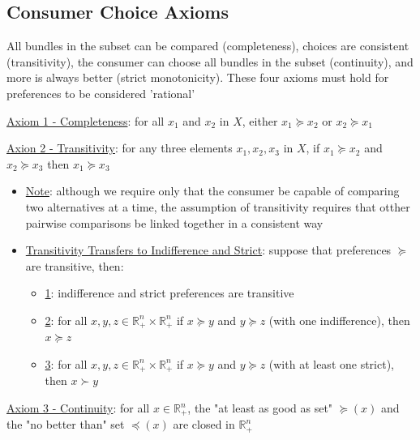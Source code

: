 \documentclass{article}
\begin{document}
\subsection{Consumer Choice Axioms}
All bundles in the subset can be compared (completeness), choices are consistent (transitivity), the consumer can choose all bundles in the subset (continuity), and more is always better (strict monotonicity). These four axioms must hold for preferences to be considered 'rational' \par \vspace{0.3em}
  \underline{Axiom 1 - Completeness}: for all $x_{1}$ and $x_{2}$ in $X$, either $x_{1} \succeq x_{2}$ or $x_{2} \succeq x_{1}$ \par
  \underline{Axion 2 - Transitivity}: for any three elements $x_{1}, x_{2}, x_{3}$ in $X$, if $x_{1} \succeq x_{2}$ and $x_{2} \succeq x_{3}$ then $x_{1} \succeq x_{3}$
  \begin{itemize}
    \item  \underline{Note}: although we require only that the consumer be capable of comparing two alternatives at a time, the assumption of transitivity requires that otther pairwise comparisons be linked together in a consistent way
    \item  \underline{Transitivity Transfers to Indifference and Strict}: suppose that preferences $\succeq$ are transitive, then:
    \begin{itemize}
      \item  \underline{1}: indifference and strict preferences are transitive
      \item  \underline{2}: for all $x, y, z \in \mathbb{R}_{+}^{n} \times \mathbb{R}_{+}^{n}$ if $x \succeq y$ and $y \succeq z$ (with one indifference), then $x \succeq z$
      \item  \underline{3}: for all $x, y, z \in \mathbb{R}_{+}^{n} \times \mathbb{R}_{+}^{n}$ if $x \succeq y$ and $y \succeq z$ (with at least one strict), then $x \succ y$
    \end{itemize}
  \end{itemize}
  \par
  \underline{Axiom 3 - Continuity}: for all $x \in \mathbb{R}_{+}^{n}$, the "at least as good as set" $\succeq (x)$ and the "no better than" set $\preceq (x)$ are closed in $\mathbb{R}_{+}^{n}$
\end{document}
